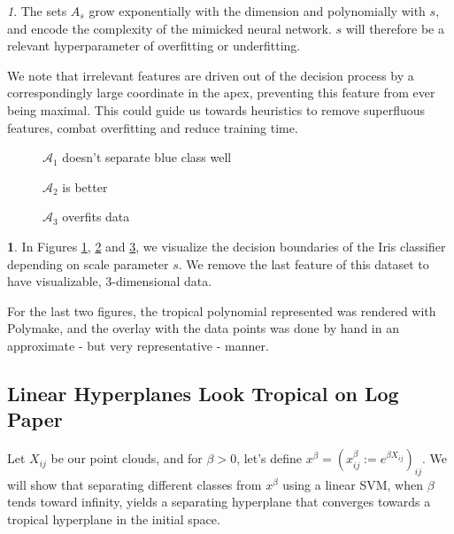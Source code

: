 \documentclass[oneside,english,a4paper]{amsart}
\numberwithin{equation}{section}
\numberwithin{figure}{section}
\theoremstyle{plain}
\theoremstyle{definition}
\theoremstyle{plain}
\theoremstyle{remark}
\newtheorem{rem}[thm]{\protect\remarkname}
\theoremstyle{plain}
\theoremstyle{definition}
\newtheorem{example}[thm]{\protect\examplename}
\theoremstyle{definition}
\providecommand{\remarkname}{Remark}
\providecommand{\examplename}{Example}
\begin{document}
\begin{rem}
The sets $A_{s}$ grow exponentially with the dimension and polynomially
with $s$, and encode the complexity of the mimicked neural network.
$s$ will therefore be a relevant hyperparameter of overfitting or
underfitting.

We note that irrelevant features are driven out of the decision process
by a correspondingly large coordinate in the apex, preventing this
feature from ever being maximal. This could guide us towards heuristics
to remove superfluous features, combat overfitting and reduce training
time.
\end{rem}

\begin{figure}
    \centering
    \resizebox{0.7\textwidth}{!}{}
    \caption{$\mathcal{A}_1$ doesn't separate blue class well}
    \label{fig:veronese_A1}
\end{figure}

\begin{figure}
    \centering
    \resizebox{0.7\textwidth}{!}{}
    \caption{$\mathcal{A}_2$ is better}
    \label{fig:veronese_A2}
\end{figure}

\begin{figure}
    \centering
    \resizebox{0.7\textwidth}{!}{}
    \caption{$\mathcal{A}_3$ overfits data}
    \label{fig:veronese_A3}
\end{figure}

\begin{example}
In Figures \ref{fig:veronese_A1}, \ref{fig:veronese_A2} and \ref{fig:veronese_A3}, we visualize the decision boundaries of the Iris classifier depending on scale parameter $s$. We remove the last feature of this dataset to have visualizable, 3-dimensional data.

For the last two figures, the tropical polynomial represented was rendered with Polymake, and the overlay with the data points was done by hand in an approximate - but very representative - manner.
\end{example}

\subsection{Linear Hyperplanes Look Tropical on Log Paper}

Let $X_{ij}$ be our point clouds, and for $\beta>0$, let's define
$x^{\beta}=(x_{ij}^{\beta}:=e^{\beta X_{ij}})_{ij}$. We will show
that separating different classes from $x^{\beta}$ using a linear
SVM, when $\beta$ tends toward infinity, yields a separating hyperplane
that converges towards a tropical hyperplane in the initial space.
\end{document}
